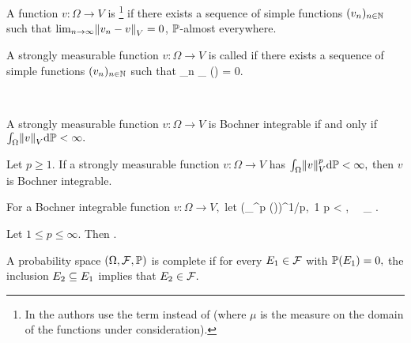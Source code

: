 \label{def:strongmeas}
A function $v:\Omega \rightarrow V$ is \footnote{In \cite{DiUh:77} the authors use the term  instead of  (where $\mu$ is the measure on the domain of the functions under consideration).} 
if there exists a sequence of simple functions $(v_{n})_{n \in \mathbb N}$ such that
$\lim_{n \rightarrow \infty} \NV{\vn - v} = 0$, %
$\mathbb P$-almost everywhere.
\ede



A strongly measurable function $v:\Omega \rightarrow V$ is called  if there exists a sequence of simple functions $(v_{n})_{n \in \mathbb N}$ such that
\beqs
\lim_{n \rightarrow \infty} \int_{\Omega}  \dd\PP(\omega) = 0.
\eeqs
\ede

\label{thm:bochnercond}

\

\noindent A strongly meas\-ur\-able function $v:\Omega \rightarrow V$ is Bochner integrable if and only if $\int_\Omega \NV{v} \dd\PP < \infty.$
\enth

\label{cor:bochnersimple}
Let $p \geq 1.$ If a strongly measurable function $v:\Omega \rightarrow V$ has $\int_\Omega \NV{v}^p \dd\PP < \infty,$ then $v$ is Bochner integrable.
\eco



\label{def:bochnernorm}
For a Bochner integrable function $v:\Omega\rightarrow V,$ let
\beqs
{} \de \mleft(\int_\Omega {}^p \dd\PP(\omega)\mright)^{1/p}, \,1 \leq p < \infty, \,\,\,\, \de \esssup_{\omega \in \Omega} .
\eeqs
\ede

\label{def:bochnerspace}
Let $1\leq p \leq \infty.$ Then
\beqs
\LpOV \de {}.
\eeqs
\ede

A probability space $\OFP$ is complete if for every $E_{1} \in \mathcal F$ with $\mathbb P(E_{1})=0,$ the inclusion $E_{2} \subseteq E_{1}$ implies that $E_{2} \in \mathcal F.$
\ede

